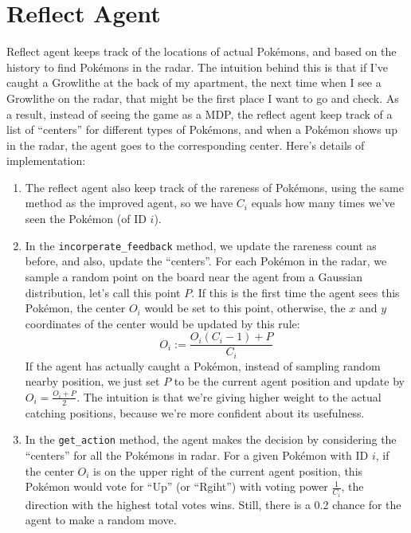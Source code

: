 \documentclass[12pt]{article}
\begin{document}
\section*{Reflect Agent}
Reflect agent keeps track of the locations of actual Pok\'emons, and based
on the history to find Pok\'emons in the radar. The intuition behind this 
is that
if I've caught a Growlithe at the back of my apartment, the next time 
when I see a Growlithe on the radar, that might be the first place I want
to go and check. 
As a result, instead of seeing the game as a MDP, 
the reflect agent keep track of a list of ``centers'' for different
types of Pok\'emons, and when a Pok\'emon shows up in the radar, the 
agent goes to the corresponding center. Here's details of implementation:
\begin{enumerate}[label=(\alph*)]
\item 
The reflect agent also keep track of the rareness of Pok\'emons, using 
the same method as the improved agent, so we have $C_i$ equals how many
times we've seen the Pok\'emon (of ID $i$).
\item
In the \texttt{incorperate\_feedback} method, we update the rareness count
as before, and also, update the ``centers''. For each Pok\'emon in the radar,
we sample a random point on the board near the agent 
from a Gaussian distribution, let's call this point $P$. If this is the 
first time the agent sees this Pok\'emon, the center
$O_i$ would be set to this point, otherwise, the $x$ and $y$ coordinates 
of the center would
be updated by this rule: 
\[
O_i := \frac{O_i (C_i-1) + P}{C_i} 
\]
If the agent has actually caught a Pok\'emon, instead of 
sampling random nearby position, we just set $P$ to be the current agent
position and update by $O_i = \frac{O_i + P}{2}$. The intuition is that
we're giving higher weight to the actual catching positions, because 
we're more confident about its usefulness.
\item
In the \texttt{get\_action} method, the agent makes the decision by
considering the ``centers'' for all the Pok\'emons in radar. For a given 
Pok\'emon with ID $i$, if the center $O_i$ is on the upper right
of the current 
agent position, this Pok\'emon would vote for
``Up'' (or ``Rgiht'') with voting power $\frac{1}{C_i}$, the direction with the
highest total votes wins. Still, there is a 0.2 chance for the agent
to make a random move.

\end{enumerate}
\end{document}
